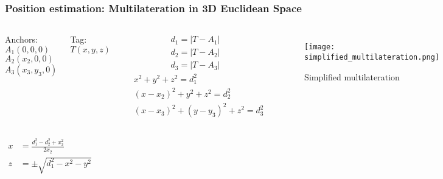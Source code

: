 \documentclass[10pt]{beamer}
\begin{document}
\begin{frame}
    \frametitle{Position estimation: Multilateration in 3D Euclidean Space}
    \begin{columns}
        \begin{columns}
            Anchors:
            $A_1(0,0,0)$\\
            $A_2(x_2,0,0)$\\
            $A_3(x_3,y_3,0)$
        \end{columns}
        \begin{columns}
            Tag:
            $T(x,y,z)$
        \end{columns}
        \begin{equation}
            \begin{split}
                d_1 = | T - A_1| \\
                d_2 = | T - A_2| \\
                d_3 = | T - A_3|
            \end{split}
        \end{equation}
        \begin{subequations}
            \begin{align}
                & x^2 + y^2 + z^2 = d_1^2 \label{eqn:d1_t_a_a}\\
                & (x-x_2)^2 + y^2 + z^2 = d_2^2 \label{eqn:d1_t_a_b}\\
                & (x-x_3)^2 + (y-y_3)^2 + z^2 = d_3^2 \label{eqn:d1_t_a_c}
            \end{align}
        \end{subequations}
        \begin{figure}[H]
            \centering
            \texttt{[image: simplified\_multilateration.png]}
            \caption{Simplified multilateration}
            \label{fig:simplified_multilateration}
        \end{figure}
    \end{columns}
    \begin{columns}
        \begin{equation}
            \begin{split}
                x &= \frac{d_1^2 - d_2^2 + x_2^2}{2x_2}\\
                z &= \pm \sqrt{d_1^2 - x^2 - y^2} \\

\end{split}
\end{equation}
\end{columns}
\end{frame}
\end{document}
